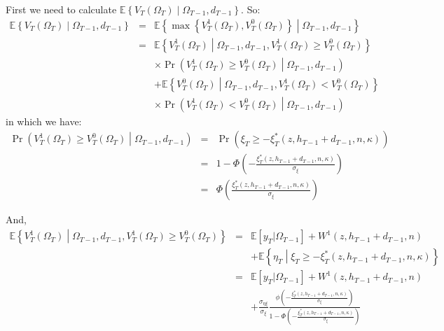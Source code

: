 \noindent First we need to calculate $\mathbb{E} \left\{ V_T\left(\Omega_T\right) \middle| \Omega_{T-1}, d_{T-1}\right\}$. So:
\begin{eqnarray*}
\mathbb{E} \left\{ V_T\left(\Omega_T\right) \middle| \Omega_{T-1}, d_{T-1}\right\} &=& \mathbb{E} \left\{ \max\left\{ V^{1}_T\left(\Omega_T\right), V^{0}_T\left(\Omega_T\right) \right\} \middle| \Omega_{T-1}, d_{T-1} \right\} \\
&=& \mathbb{E} \left\{ V^{1}_T\left(\Omega_T\right) \middle| \Omega_{T-1}, d_{T-1}, V^{1}_T\left(\Omega_T\right) \geq V^{0}_T\left(\Omega_T\right) \right\} \\
& & \times \Pr\left(V^1_T\left(\Omega_T\right) \geq V^0_T\left(\Omega_T\right) \middle| \Omega_{T-1}, d_{T-1} \right)\\
& & + \mathbb{E} \left\{ V^{0}_T\left(\Omega_T\right) \middle| \Omega_{T-1}, d_{T-1}, V^{1}_T\left(\Omega_T\right) < V^{0}_T\left(\Omega_T\right) \right\} \\
& & \times \Pr\left(V^1_T\left(\Omega_T\right) < V^0_T\left(\Omega_T\right) \middle| \Omega_{T-1}, d_{T-1} \right)
\end{eqnarray*}
in which we have:
\begin{eqnarray*}
\Pr\left(V^1_T\left(\Omega_T\right) \geq V^0_T\left(\Omega_T\right) \middle| \Omega_{T-1}, d_{T-1} \right) &=& \Pr\left(\xi_T \geq - \xi^*_T\left(z, h_{T-1}+d_{T-1},n,\kappa\right)\right)\\
&=& 1 - \Phi\left( -\frac{\xi^*_T\left(z,h_{T-1}+d_{T-1},n,\kappa\right)}{\sigma_\xi}\right)\\
&=& \Phi\left( \frac{\xi^*_T\left(z,h_{T-1}+d_{T-1},n,\kappa\right)}{\sigma_\xi}\right)
\end{eqnarray*}

\noindent And,
\begin{eqnarray*}
\mathbb{E} \left\{ V^{1}_T\left(\Omega_T\right) \middle| \Omega_{T-1}, d_{T-1}, V^{1}_T\left(\Omega_T\right) \geq V^{0}_T\left(\Omega_T\right) \right\} &=& \mathbb{E} [y_T | \Omega_{T-1}] + W^1\left( z,h_{T-1}+d_{T-1},n\right) \\
& & +\mathbb{E} \left\{\eta_T \middle| \xi_T \geq - \xi^*_T\left( z, h_{T-1}+d_{T-1}, n, \kappa \right)\right\} \\
&=& \mathbb{E} [y_T | \Omega_{T-1}] + W^1\left( z,h_{T-1}+d_{T-1},n \right) \\
& & +  \frac{\sigma_{\eta \xi}}{\sigma_\xi} \frac{\phi\left(-\frac{\xi^*_T\left(z,h_{T-1}+d_{T-1},n,\kappa\right)}{\sigma_\xi}\right)}{1-\Phi\left(-\frac{\xi^*_T\left(z,h_{T-1}+d_{T-1},n,\kappa\right)}{\sigma_\xi}\right)}
\end{eqnarray*}

